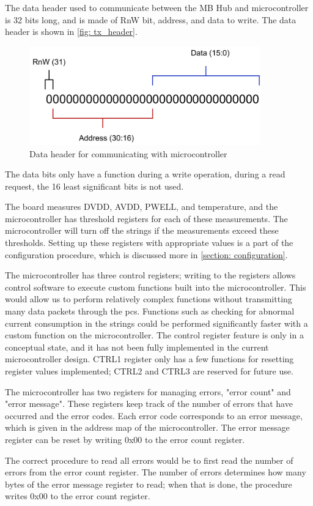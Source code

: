 \documentclass[main.tex]{subfiles}
\begin{document}
The data header used to communicate between the MB Hub and microcontroller is 32 bits long, and is made of RnW bit, address, and data to write. The data header is shown in \autoref{fig: tx_header}.

\begin{figure}[!htpb]
    \centering
    \includegraphics[width=10cm, scale=1]{images/TX packet header.pdf}
    \caption{Data header for communicating with microcontroller}
    \label{fig: tx_header}
\end{figure}
\FloatBarrier

The data bits only have a function during a write operation, during a read request, the 16 least significant bits is not used.

The board measures DVDD, AVDD, PWELL, and temperature, and the microcontroller has threshold registers for each of these measurements. The microcontroller will turn off the strings if the measurements exceed these thresholds. Setting up these registers with appropriate values is a part of the configuration procedure, which is discussed more in \autoref{section: configuration}.

The microcontroller has three control registers; writing to the registers allows control software to execute custom functions built into the microcontroller. This would allow us to perform relatively complex functions without transmitting many data packets through the \gls{pcs}. Functions such as checking for abnormal current consumption in the strings could be performed significantly faster with a custom function on the microcontroller. The control register feature is only in a conceptual state, and it has not been fully implemented in the current microcontroller design. CTRL1 register only has a few functions for resetting register values implemented; CTRL2 and CTRL3 are reserved for future use.


The microcontroller has two registers for managing errors, "error count" and "error message". These registers keep track of the number of errors that have occurred and the error codes. Each error code corresponds to an error message, which is given in the address map of the microcontroller. The error message register can be reset by writing 0x00 to the error count register.

The correct procedure to read all errors would be to first read the number of errors from the error count register. The number of errors determines how many bytes of the error message register to read; when that is done, the procedure writes 0x00 to the error count register.

\end{document}
